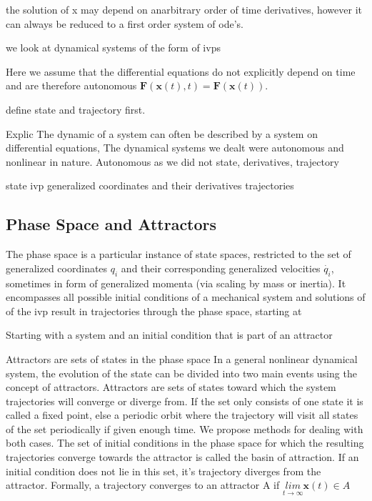     the solution of x may depend on anarbitrary order of time derivatives, however it can always be reduced to a first order system of ode's. 

    we look at dynamical systems of the form of ivps  


    Here we assume that the differential equations do not explicitly depend on time and are therefore autonomous $\mathbf{F}(\mathbf{x}(t),t) = \mathbf{F}(\mathbf{x}(t))$.   

    define state and trajectory first.


    Explic 
    The dynamic of a system can often be described by a system on differential equations, 
    The dynamical systems we dealt were autonomous and nonlinear in nature. Autonomous as we did not 
    state, derivatives, trajectory

    state
    ivp
    generalized coordinates and their derivatives
    trajectories 




\subsection{Phase Space and Attractors}
    

    
    The phase space is a particular instance of state spaces, restricted to the set of generalized coordinates $q_i$ and their corresponding generalized velocities $\dot{q_i}$, sometimes in form of generalized momenta (via scaling by mass or inertia). It encompasses all possible initial conditions of a mechanical system and solutions of of the ivp result in trajectories through the phase space, starting at 


    Starting with a system and an initial condition that is part of an attractor 

    Attractors are sets of states in the phase space
    In a general nonlinear dynamical system, the evolution of the state can be divided into two main events using the concept of attractors. Attractors are sets of states toward which the system trajectories will converge or diverge from. If the set only consists of one state it is called a fixed point, else a periodic orbit where the trajectory will visit all states of the set periodically if given enough time. 
    We propose methods for dealing with both cases. 
    The set of initial conditions in the phase space for which the resulting trajectories converge towards the attractor is called the basin of attraction. If an initial condition does not lie in this set, it's trajectory diverges from the attractor. 
    Formally, a trajectory converges to an attractor A if $\underset{t \rightarrow \infty}{lim}\mathbf{x}(t) \in A$ 


